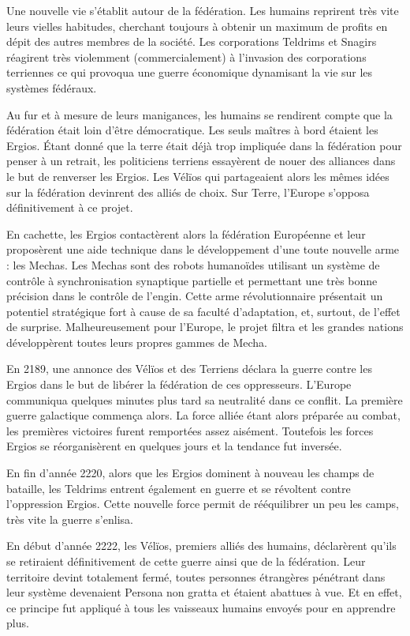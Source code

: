 \begin{multicols}{2}
Une nouvelle vie s’établit autour de la fédération. Les humains reprirent très vite leurs vielles habitudes, cherchant toujours à obtenir un maximum de profits en dépit des autres membres de la société. Les corporations Teldrims et Snagirs réagirent très violemment (commercialement) à l’invasion des corporations terriennes ce qui provoqua une guerre économique dynamisant la vie sur les systèmes fédéraux.

Au fur et à mesure de leurs manigances, les humains se rendirent compte que la fédération était loin d’être démocratique. Les seuls maîtres à bord étaient les Ergios. Étant donné que la terre était déjà trop impliquée dans la fédération pour penser à un retrait, les politiciens terriens essayèrent de nouer des alliances dans le but de renverser les Ergios. Les Vélïos qui partageaient alors les mêmes idées sur la fédération devinrent des alliés de choix. Sur Terre, l’Europe s’opposa définitivement à ce projet.

En cachette, les Ergios contactèrent alors la fédération Européenne et leur proposèrent une aide technique dans le développement d’une toute nouvelle arme : les Mechas. Les Mechas sont des robots humanoïdes utilisant un système de contrôle à synchronisation synaptique partielle et permettant une très bonne précision dans le contrôle de l’engin. Cette arme révolutionnaire présentait un potentiel stratégique fort à cause de sa faculté d’adaptation, et, surtout, de l’effet de surprise. Malheureusement pour l’Europe, le projet filtra et les grandes nations développèrent toutes leurs propres gammes de Mecha. 

En 2189, une annonce des Vélïos et des Terriens déclara la guerre contre les Ergios dans le but de libérer la fédération de ces oppresseurs. L’Europe communiqua quelques minutes plus tard sa neutralité dans ce conflit. La première guerre galactique commença alors. La force alliée étant alors préparée au combat, les premières victoires furent remportées assez aisément. Toutefois les forces Ergios se réorganisèrent en quelques jours et la tendance fut inversée.

En fin d’année 2220, alors que les Ergios dominent à nouveau les champs de bataille, les Teldrims entrent également en guerre et se révoltent contre l’oppression Ergios. Cette nouvelle force permit de rééquilibrer un peu les camps, très vite la guerre s’enlisa. 

En début d’année 2222, les Vélïos, premiers alliés des humains, déclarèrent qu’ils se retiraient définitivement de cette guerre ainsi que de la fédération. Leur territoire devint totalement fermé, toutes personnes étrangères pénétrant dans leur système devenaient Persona non gratta et étaient abattues à vue. Et en effet, ce principe fut appliqué à tous les vaisseaux humains envoyés pour en apprendre plus. 


\end{multicols}
